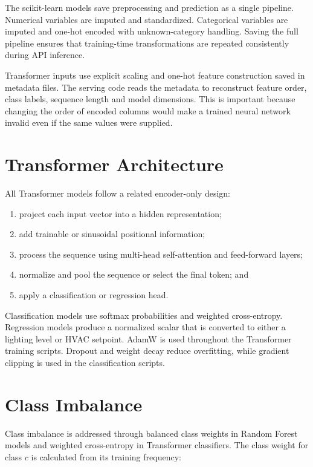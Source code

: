 The scikit-learn models save preprocessing and prediction as a single pipeline.
Numerical variables are imputed and standardized. Categorical variables are
imputed and one-hot encoded with unknown-category handling. Saving the full
pipeline ensures that training-time transformations are repeated consistently
during API inference.

Transformer inputs use explicit scaling and one-hot feature construction saved
in metadata files. The serving code reads the metadata to reconstruct feature
order, class labels, sequence length and model dimensions. This is important
because changing the order of encoded columns would make a trained neural
network invalid even if the same values were supplied.

\section{Transformer Architecture}

All Transformer models follow a related encoder-only design:

\begin{enumerate}
    \item project each input vector into a hidden representation;
    \item add trainable or sinusoidal positional information;
    \item process the sequence using multi-head self-attention and feed-forward
    layers;
    \item normalize and pool the sequence or select the final token; and
    \item apply a classification or regression head.
\end{enumerate}

Classification models use softmax probabilities and weighted cross-entropy.
Regression models produce a normalized scalar that is converted to either a
lighting level or HVAC setpoint. AdamW is used throughout the Transformer
training scripts. Dropout and weight decay reduce overfitting, while gradient
clipping is used in the classification scripts.

\section{Class Imbalance}

Class imbalance is addressed through balanced class weights in Random Forest
models and weighted cross-entropy in Transformer classifiers. The class weight
for class $c$ is calculated from its training frequency:


